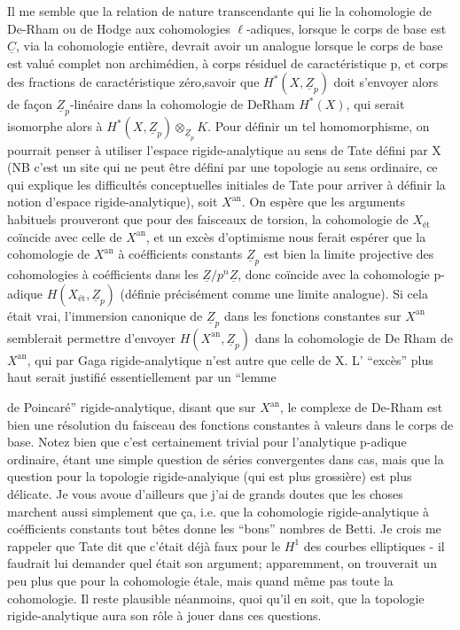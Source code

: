 Il me semble que la relation de nature transcendante qui lie la cohomologie de De-Rham ou de Hodge aux cohomologies $\ell$-adiques, lorsque le corps de base est $\underline C$, via la cohomologie entière, devrait avoir un analogue lorsque le corps de base est  valué complet non archimédien, à corps résiduel de caractéristique p,  et corps des fractions  de caractéristique zéro,savoir que $H^*(X,\underline Z_p)$ doit s'envoyer alors de façon $\underline Z_p$-linéaire dans la cohomologie de De\unsure{-}Rham $H^*(X)$, qui serait isomorphe alors à $H^*(X,\underline Z_p)\otimes_{\underline Z_p}K$. Pour définir un tel homomorphisme, on pourrait penser à utiliser l'espace rigide-analytique au sens de Tate défini par X (NB c'est un site qui ne peut être défini par une topologie au sens ordinaire, ce qui explique les difficultés conceptuelles initiales de Tate pour arriver à définir la notion d'espace rigide-analytique), soit $X^{\mathrm{an}}$. On espère que les arguments habituels prouveront que pour des faisceaux de torsion, la cohomologie de $X_{\text{ét}}$ coïncide avec celle de $X^{\mathrm{an}}$, et un excès d'optimisme nous ferait espérer que la cohomologie de $X^{\mathrm{an}}$ à coéfficients constants $\underline Z_p$ est bien la limite projective des cohomologies à coéfficients dans les $\underline Z/p^n\underline Z$, donc coïncide avec la cohomologie p-adique $H(X_{\text{ét}},\underline Z_p)$ (définie précisément comme une limite analogue). Si cela était vrai, l'immersion canonique de $\underline Z_p$ dans les fonctions constantes sur $X^{\mathrm{an}}$ semblerait permettre d'envoyer $H(X^{\mathrm{an}},\underline Z_p)$ dans la cohomologie de De Rham de $X^{\mathrm{an}}$, qui par Gaga rigide-analytique n'est autre que celle de X. L' ``excès'' plus haut serait justifié essentiellement par un ``lemme


de Poincaré'' rigide-analytique, disant que sur $X^{\mathrm{an}}$, le complexe de De-Rham est bien une résolution du faisceau des fonctions constantes à valeurs dans le corps de base. Notez bien que c'est certainement trivial pour l'analytique p-adique ordinaire, étant une simple question de séries convergentes dans  cas, mais que la question pour la topologie rigide-analyique (qui est  plus grossière) est plus délicate. Je vous avoue d'ailleurs que j'ai de grands doutes que les choses marchent aussi simplement que ça, i.e. que la cohomologie rigide-analytique à coéfficients constants tout bêtes donne les ``bons'' nombres de Betti. Je crois me rappeler que Tate  dit que c'était déjà faux pour le $H^1$ des courbes elliptiques - il faudrait lui demander quel était son argument; apparemment, on trouverait un peu plus que pour la cohomologie étale, mais quand même pas toute la cohomologie. Il reste plausible néanmoins, quoi qu'il en soit, que la topologie rigide-analytique aura son rôle à jouer dans ces questions.

